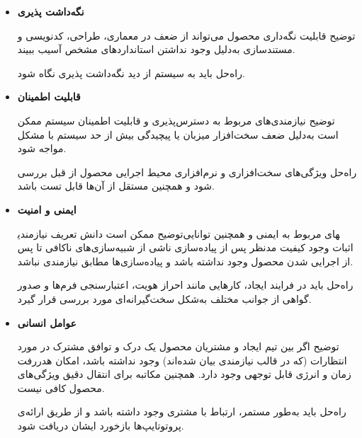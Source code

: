 \begin{itemize}
	
	\item 
	\textbf{نگه‌داشت پذیری }

	توضیح \hspace*{1cm} 
قابلیت نگه‌داری محصول می‌تواند از ضعف در معماری، طراحی، کدنویسی و مستندسازی به‌دلیل وجود نداشتن استانداردهای مشخص آسیب ببیند.
	
	راه‌حل \hspace*{1cm} 
باید به سیستم از دید نگه‌داشت پذیری نگاه شود.
		
	\item 
	\textbf{قابلیت اطمینان }

	توضیح \hspace*{1cm} 
نیازمندی‌های مربوط به دسترس‌پذیری و قابلیت اطمینان سیستم ممکن است به‌دلیل ضعف سخت‌افزار میزبان یا پیچیدگی بیش از حد سیستم با مشکل مواجه شود.
	
	راه‌حل \hspace*{1cm} 
ویژگی‌های سخت‌افزاری و نرم‌افزاری محیط اجرایی محصول از قبل بررسی شود و همچنین مستقل از آن‌ها قابل تست باشد.
		
	\item 
	\textbf{ایمنی و امنیت}

	توضیح \hspace*{1cm} 
ممکن است دانش تعریف نیازمندی‎های مربوط به ایمنی و همچنین توانایی اثبات وجود کیفیت مدنظر پس از پیاده‌سازی ناشی از شبیه‌سازی‌های ناکافی تا پس از اجرایی شدن محصول وجود نداشته باشد و پیاده‌سازی‌ها مطابق نیازمندی نباشد.
	
	راه‌حل \hspace*{1cm} 
باید در فرایند ایجاد، کارهایی مانند احراز هویت، اعتبارسنجی فرم‌ها و صدور گواهی از جوانب مختلف به‌شکل سخت‌گیرانه‌ای مورد بررسی قرار گیرد.
		
	\item 
	\textbf{عوامل انسانی}

	توضیح \hspace*{1cm} 
اگر بین تیم ایجاد و مشتریان محصول یک درک و توافق مشترک در مورد انتظارات (که در قالب نیازمندی بیان شده‌اند) وجود نداشته باشد، امکان هدررفت زمان و انرژی قابل توجهی وجود دارد. همچنین مکاتبه برای انتقال دقیق ویژگی‌های محصول کافی نیست.
	
	راه‌حل \hspace*{1cm} 
باید به‌طور مستمر، ارتباط با مشتری وجود داشته باشد و از طریق ارائه‌ی پروتوتایپ‌ها بازخورد ایشان دریافت شود.
				
\end{itemize}

